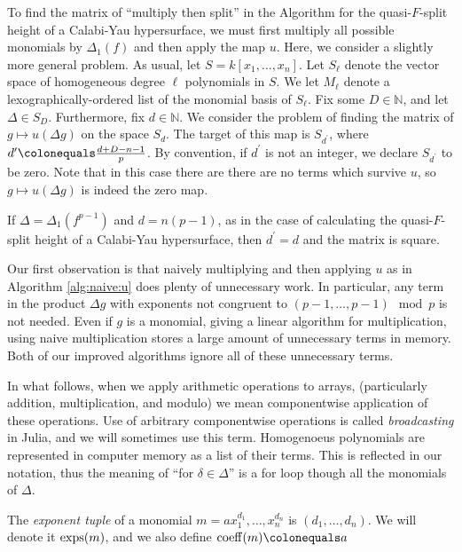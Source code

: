 
To find the matrix of ``multiply then split''
in the Algorithm for the quasi-\(F\)-split height
of a Calabi-Yau hypersurface, 
we must first multiply all possible 
monomials by \(\Delta_{1}(f)\) 
and then apply the map \(u\).
Here, we consider a slightly more general problem.
As usual, let \(S = k[x_{1}, \ldots, x_{n}]\).
Let $S_\ell$ denote the vector space of homogeneous degree $\ell$ polynomials in \(S\).
We let \(M_{\ell}\) denote a lexographically-ordered list
of the monomial basis of \(S_{\ell}\).
Fix some \(D \in \mathbb{N}\), and let \(\Delta \in S_D\).
Furthermore, fix \(d \in \mathbb{N}\).
We consider the problem of finding the matrix of 
\(g \mapsto u(\Delta g)\)
on the space \(S_{d}\).
The target of this map is
\(S_{d^{\prime}}\), where
\(d^{\prime} \colonequals \frac{d+D-n-1}{p}\).
By convention, if \(d^{\prime}\) is not an integer,
we declare \(S_{d^{\prime}}\) to be zero.
Note that in this case there are
there are no terms which survive \(u\), so
\(g \mapsto u(\Delta g)\) is indeed the zero map.

\begin{rmk}
    If \(\Delta = \Delta_{1}(f^{p-1})\) and \(d = n(p-1)\),
	as in the case of calculating the quasi-\(F\)-split
	height of a Calabi-Yau hypersurface, 
	then \(d^{\prime} = d\) and the matrix is 
	square.
\end{rmk}

Our first observation is that naively 
multiplying and then applying \(u\) 
as in Algorithm \ref{alg:naive:u}
does plenty of unnecessary work.
In particular, any term in the 
product \(\Delta g\) with exponents 
not congruent to 
\((p-1, \ldots, p-1) \mod p\)
is not needed. 
Even if \(g\) is a monomial, giving a linear
algorithm for multiplication, using naive
multiplication stores a large amount of unnecessary terms
in memory.
Both of our improved algorithms ignore
all of these unnecessary terms.

In what follows, 
when we apply arithmetic operations to arrays, 
(particularly addition, multiplication, and modulo)
we mean componentwise application of these operations.
Use of arbitrary componentwise operations is called
\textit{broadcasting} in Julia, and we will
sometimes use this term.
Homogenoeus polynomials are represented in computer 
memory as a list of their terms. 
This is reflected in our notation, 
thus the meaning of ``for \(\delta \in \Delta\)''
is a for loop though all the monomials
of \(\Delta\).

\begin{defn}
    \label{def:poly:nota}
    The \textit{exponent tuple} of a monomial 
    $m = ax_{1}^{d_1}, \dots, x_{n}^{d_n}$ is $(d_1, \dots, d_n)$. 
	We will denote it $\operatorname{exps}(m)$, and we also 
    define $\coeff(m) \colonequals a$
\end{defn}

